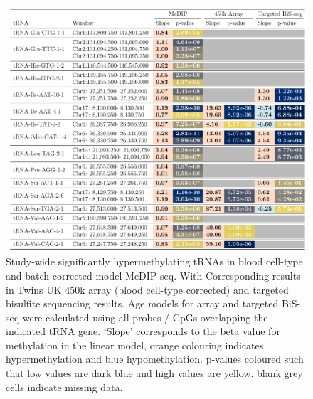 \documentclass[
]{book}
\begin{document}
\begin{figure}

{\centering \includegraphics[width=0.95\linewidth]{./figs/table1a} 

}

\caption{Study-wide significantly hypermethylating tRNAs in blood cell-type and batch corrected model MeDIP-seq. With Corresponding results in Twins UK 450k array (blood cell-type corrected) and targeted bisulfite sequencing results. Age models for array and targeted BiS-seq were calculated using all probes / CpGs overlapping the indicated tRNA gene. `Slope' corresponds to the beta value for methylation in the linear model, orange colouring indicates hypermethylation and blue hypomethylation. p-values coloured such that low values are dark blue and high values are yellow. blank grey cells indicate missing data.}\label{fig:GWSBBtRNAsTab}
\end{figure}
\end{document}
